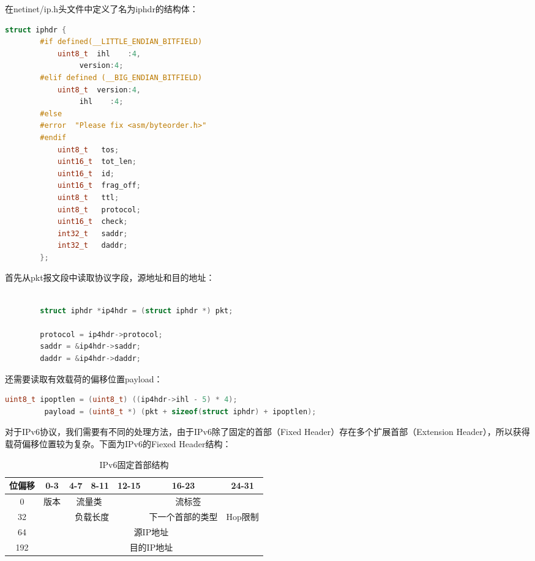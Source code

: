 \documentclass[format=final, language=chinese, degree=fyp]{hustthesis}
\begin{document}
在netinet/ip.h头文件中定义了名为iphdr的结构体：
\begin{lstlisting}[language=c]
        struct iphdr {
        #if defined(__LITTLE_ENDIAN_BITFIELD)
            uint8_t  ihl    :4,
                 version:4;
        #elif defined (__BIG_ENDIAN_BITFIELD)
            uint8_t  version:4,
                 ihl    :4;
        #else
        #error	"Please fix <asm/byteorder.h>"
        #endif
            uint8_t	  tos;
            uint16_t  tot_len;
            uint16_t  id;
            uint16_t  frag_off;
            uint8_t   ttl;
            uint8_t   protocol;
            uint16_t  check;
            int32_t   saddr;
            int32_t   daddr;
        };
\end{lstlisting}

首先从pkt报文段中读取协议字段，源地址和目的地址：

\begin{lstlisting}[language=c]

        struct iphdr *ip4hdr = (struct iphdr *) pkt;

        protocol = ip4hdr->protocol;
        saddr = &ip4hdr->saddr;
        daddr = &ip4hdr->daddr;

\end{lstlisting}

还需要读取有效载荷的偏移位置payload：

\begin{lstlisting}[language=c]
         uint8_t ipoptlen = (uint8_t) ((ip4hdr->ihl - 5) * 4);
         payload = (uint8_t *) (pkt + sizeof(struct iphdr) + ipoptlen);
\end{lstlisting}

对于IPv6协议，我们需要有不同的处理方法，由于IPv6除了固定的首部（Fixed Header）存在多个扩展首部（Extension Header），所以获得载荷偏移位置较为复杂。下面为IPv6的Fiexed Header结构：


\begin{table}[h!]
\centering
\caption{IPv6固定首部结构}\label{tab:1}
\begin{tabular}{|c|c|c|c|c|c|c|}
	\hline
	位偏移 & 0-3 & 4-7 & 8-11 & 12-15 & 16-23 & 24-31\\
	\hline
	0 & 版本 & \multicolumn{2}{c|}{流量类} & \multicolumn{3}{c|}{流标签}\\
	\hline
	32 & \multicolumn{4}{c|}{负载长度} & 下一个首部的类型 & Hop限制 \\
	\hline
	64 & \multicolumn{6}{c|}{源IP地址} \\
	\hline
	192 & \multicolumn{6}{c|}{目的IP地址} \\
	\hline
\end{tabular}
\end{table}
\end{document}
